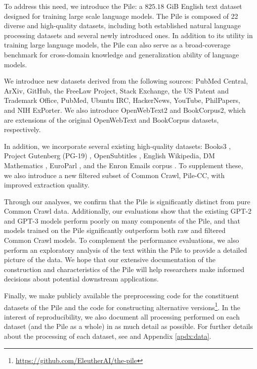 \documentclass[11pt,a4paper]{article}
\begin{document}
To address this need, we introduce the Pile: a $825.18$ GiB English text dataset designed for training large scale language models. The Pile is composed of 22 diverse and high-quality datasets, including both established natural language processing datasets and several newly introduced ones. In addition to its utility in training large language models, the Pile can also serve as a broad-coverage benchmark for cross-domain knowledge and generalization ability of language models.

We introduce new datasets derived from the following sources: PubMed Central, ArXiv, GitHub, the FreeLaw Project, Stack Exchange, the US Patent and Trademark Office, PubMed, Ubuntu IRC, HackerNews, YouTube, PhilPapers, and NIH ExPorter. We also introduce OpenWebText2 and BookCorpus2, which are extensions of the original OpenWebText \citep{OpenWeb} and BookCorpus \citep{BookCorpus,BookCorpusCode} datasets, respectively.

In addition, we incorporate several existing high-quality datasets: Books3 \citep{bibliotik}, Project Gutenberg (PG-19) \citep{PG19}, OpenSubtitles \citep{OpenSubtitles}, English Wikipedia, DM Mathematics \citep{dm-mathematics}, EuroParl \citep{EuroParl}, and the Enron Emails corpus \citep{Enron}. To supplement these, we also introduce a new filtered subset of Common Crawl, Pile-CC, with improved extraction quality.

Through our analyses, we confirm that the Pile is significantly distinct from pure Common Crawl data. Additionally, our evaluations show that the existing GPT-2 and GPT-3 models perform poorly on many components of the Pile, and that models trained on the Pile significantly outperform both raw and filtered Common Crawl models. To complement the performance evaluations, we also perform an exploratory analysis of the text within the Pile to provide a detailed picture of the data. We hope that our extensive documentation of the construction and characteristics of the Pile will help researchers make informed decisions about potential downstream applications.

Finally, we make publicly available the preprocessing code for the constituent datasets of the Pile and the code for constructing alternative versions\footnote{\url{https://github.com/EleutherAI/the-pile}}. In the interest of reproducibility, we also document all processing performed on each dataset (and the Pile as a whole) in as much detail as possible. For further details about the processing of each dataset, see  and Appendix \ref{apdx:data}.
\end{document}
